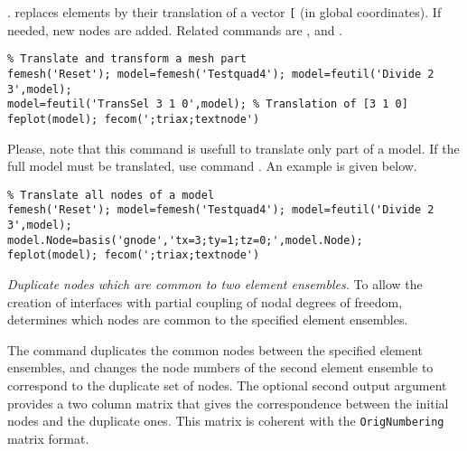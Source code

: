 .   replaces elements by their translation of a vector {\tt [}\tsi{tx ty tz}{\tt ]} (in global coordinates).  If needed, new nodes are added.  Related commands are ,  and .

\begin{verbatim}
% Translate and transform a mesh part
femesh('Reset'); model=femesh('Testquad4'); model=feutil('Divide 2 3',model); 
model=feutil('TransSel 3 1 0',model); % Translation of [3 1 0]
feplot(model); fecom(';triax;textnode')
\end{verbatim}%

Please, note that this command is usefull to translate only part of a model. If the full model must be translated, use \basis command . An example is given below.

\begin{verbatim}
% Translate all nodes of a model
femesh('Reset'); model=femesh('Testquad4'); model=feutil('Divide 2 3',model); 
model.Node=basis('gnode','tx=3;ty=1;tz=0;',model.Node);
feplot(model); fecom(';triax;textnode')
\end{verbatim}%



{\sl Duplicate nodes which are common to two element ensembles.} To allow the creation of interfaces with partial coupling of nodal degrees of freedom,  determines which nodes are common to the specified element ensembles. 

The command duplicates the common nodes between the specified element ensembles, and changes the node numbers of the second element ensemble to correspond to the duplicate set of nodes. The optional second output argument provides a two column matrix that gives the correspondence between the initial nodes and the duplicate ones. This matrix is coherent with the {\tt OrigNumbering} matrix format.

